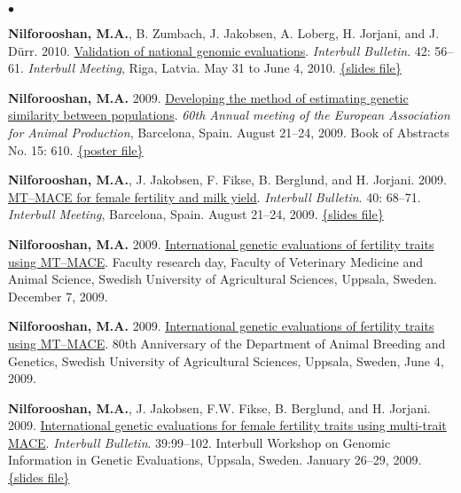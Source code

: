 \documentclass[margin,line]{res}
\newenvironment{list2}{
  \begin{list}{$\bullet$}{%
      \setlength{\itemsep}{0in}
      \setlength{\parsep}{0in} \setlength{\parskip}{0in}
      \setlength{\topsep}{0in} \setlength{\partopsep}{0in}
      \setlength{\leftmargin}{0.2in}}}{\end{list}}
\begin{document}
\begin{resume}
\begin{list2}
    \item {\bf Nilforooshan, M.A.}, B. Zumbach, J. Jakobsen, A. Loberg, H. Jorjani, and J. D\"{u}rr. 2010. \href{https://www.researchgate.net/publication/358199921_Validation_of_National_Genomic_Evaluations}{Validation of national genomic evaluations}. {\em Interbull Bulletin}. 42: 56--61. {\em Interbull Meeting}, Riga, Latvia. May 31 to June 4, 2010. \href{https://drive.google.com/file/d/0B2l_izQwJmVpRnlPa0YzS3ZCU1E/view?usp=sharing&resourcekey=0-Tsw-3ZQhJPn8Cm8kG1E6xw}{\{slides file\}}
    \item {\bf Nilforooshan, M.A.} 2009. \href{https://www.researchgate.net/publication/358219264_Developing_the_method_of_estimating_genetic_similarity_between_populations}{Developing the method of estimating genetic similarity between populations}. {\em 60th Annual meeting of the European Association for Animal Production}, Barcelona, Spain. August 21--24, 2009. Book of Abstracts No. 15: 610. \href{https://doi.org/10.13140/RG.2.2.11140.40320}{\{poster file\}}
    \item {\bf Nilforooshan, M.A.}, J. Jakobsen, F. Fikse, B. Berglund, and H. Jorjani. 2009. \href{https://www.researchgate.net/publication/239611615_MT-MACE_for_Female_Fertility_and_Milk_Yield}{MT–MACE for female fertility and milk yield}. {\em Interbull Bulletin}. 40: 68--71. {\em Interbull Meeting}, Barcelona, Spain. August 21--24, 2009. \href{https://drive.google.com/file/d/0B2l_izQwJmVpRTlrOGE3OWluVnc/view?usp=sharing&resourcekey=0-LiA6IgIqSEjLxrAFkXL_Bw}{\{slides file\}}
    \item {\bf Nilforooshan, M.A.} 2009. \href{https://drive.google.com/file/d/0B2l_izQwJmVpUC1TVkx2MVc1ZUE/view?usp=sharing&resourcekey=0-l8dXNYtXDSBuYJHiZwAxZQ}{International genetic evaluations of fertility traits using MT–MACE}. Faculty research day, Faculty of Veterinary Medicine and Animal Science, Swedish University of Agricultural Sciences, Uppsala, Sweden. December 7, 2009.
    \item {\bf Nilforooshan, M.A.} 2009. \href{https://drive.google.com/file/d/0B2l_izQwJmVpUC1TVkx2MVc1ZUE/view?usp=sharing&resourcekey=0-l8dXNYtXDSBuYJHiZwAxZQ}{International genetic evaluations of fertility traits using MT–MACE}. 80th Anniversary of the Department of Animal Breeding and Genetics, Swedish University of Agricultural Sciences, Uppsala, Sweden, June 4, 2009.
    \item {\bf Nilforooshan, M.A.}, J. Jakobsen, F.W. Fikse, B. Berglund, and H. Jorjani. 2009. \href{https://www.researchgate.net/publication/237781427_International_Genetic_Evaluations_for_Female_Fertility_Traits_Using_Multi-trait_MACE}{International genetic evaluations for female fertility traits using multi-trait MACE}. {\em Interbull Bulletin}. 39:99--102. Interbull Workshop on Genomic Information in Genetic Evaluations, Uppsala, Sweden. January 26--29, 2009. \href{https://drive.google.com/file/d/0B2l_izQwJmVpZG1sZlg2cF9zRWc/view?usp=sharing&resourcekey=0-JmFa0ZnWzZzcCnjVFH3VoA}{\{slides file\}}

\end{list2}
\end{resume}
\end{document}

